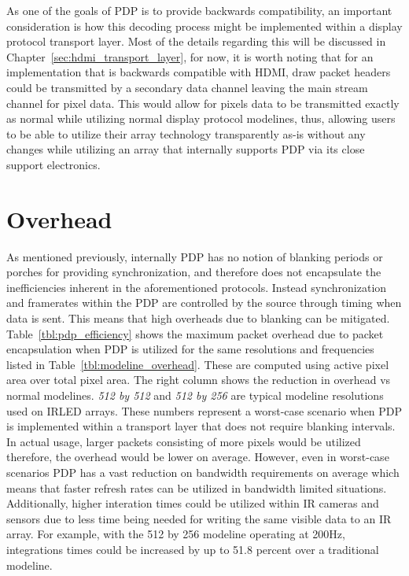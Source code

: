     As one of the goals of PDP is to provide backwards compatibility, an important consideration is how this decoding process might be implemented within a display protocol transport layer. Most of the details regarding this will be discussed in Chapter~\ref{sec:hdmi_transport_layer}, for now, it is worth noting that for an implementation that is backwards compatible with HDMI, draw packet headers could be transmitted by a secondary data channel leaving the main stream channel for pixel data. This would allow for pixels data to be transmitted exactly as normal while utilizing normal display protocol modelines, thus, allowing users to be able to utilize their array technology transparently as-is without any changes while utilizing an array that internally supports PDP via its close support electronics.

\section{Overhead}
    As mentioned previously, internally PDP has no notion of blanking periods or porches for providing synchronization, and therefore does not encapsulate the inefficiencies inherent in the aforementioned protocols. Instead synchronization and framerates within the PDP are controlled by the source through timing when data is sent. This means that high overheads due to blanking can be mitigated. Table~\ref{tbl:pdp_efficiency} shows the maximum packet overhead due to packet encapsulation when PDP is utilized for the same resolutions and frequencies listed in Table~\ref{tbl:modeline_overhead}. These are computed using active pixel area over total pixel area. The right column shows the reduction in overhead vs normal modelines. {\it 512 by 512} and {\it 512 by 256} are typical modeline resolutions used on IRLED arrays. These numbers represent a worst-case scenario when PDP is implemented within a transport layer that does not require blanking intervals. In actual usage, larger packets consisting of more pixels would be utilized therefore, the overhead would be lower on average. However, even in worst-case scenarios PDP has a vast reduction on bandwidth requirements on average which means that faster refresh rates can be utilized in bandwidth limited situations. Additionally, higher interation times could be utilized within IR cameras and sensors due to less time being needed for writing the same visible data to an IR array. For example, with the 512 by 256 modeline operating at 200Hz, integrations times could be increased by up to 51.8 percent over a traditional modeline.

